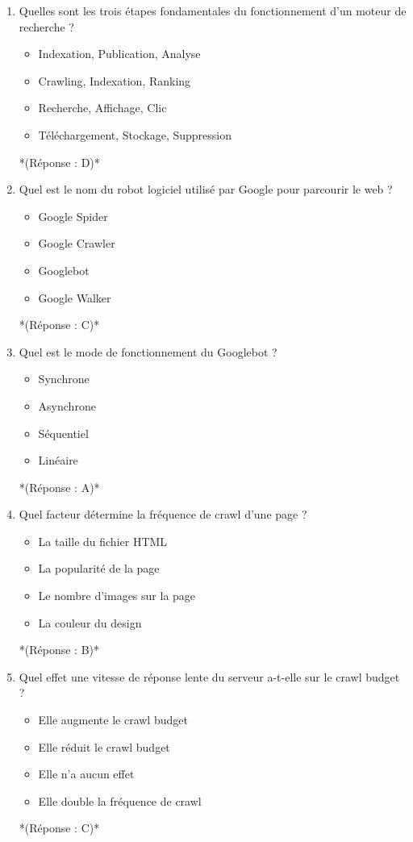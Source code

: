 \documentclass[12pt,a4paper,twoside]{report}
\begin{document}
\begin{enumerate}
\item Quelles sont les trois étapes fondamentales du fonctionnement d'un moteur de recherche ?
\begin{itemize}
\item[A)] Indexation, Publication, Analyse
\item[B)] Crawling, Indexation, Ranking
\item[C)] Recherche, Affichage, Clic
\item[D)] Téléchargement, Stockage, Suppression
\end{itemize}
*(Réponse : D)*

\item Quel est le nom du robot logiciel utilisé par Google pour parcourir le web ?
\begin{itemize}
\item[A)] Google Spider
\item[B)] Google Crawler
\item[C)] Googlebot
\item[D)] Google Walker
\end{itemize}
*(Réponse : C)*

\item Quel est le mode de fonctionnement du Googlebot ?
\begin{itemize}
\item[A)] Synchrone
\item[B)] Asynchrone
\item[C)] Séquentiel
\item[D)] Linéaire
\end{itemize}
*(Réponse : A)*

\item Quel facteur détermine la fréquence de crawl d'une page ?
\begin{itemize}
\item[A)] La taille du fichier HTML
\item[B)] La popularité de la page
\item[C)] Le nombre d'images sur la page
\item[D)] La couleur du design
\end{itemize}
*(Réponse : B)*

\item Quel effet une vitesse de réponse lente du serveur a-t-elle sur le crawl budget ?
\begin{itemize}
\item[A)] Elle augmente le crawl budget
\item[B)] Elle réduit le crawl budget
\item[C)] Elle n'a aucun effet
\item[D)] Elle double la fréquence de crawl
\end{itemize}
*(Réponse : C)*


\end{enumerate}
\end{document}
